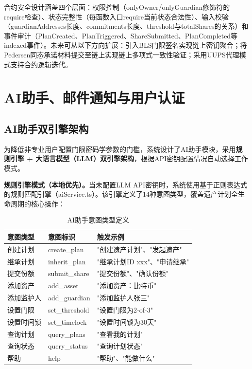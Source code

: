 \documentclass[UTF8,a4paper,zihao=-4,openany]{ctexrep}
\begin{document}
合约安全设计涵盖四个层面：权限控制（onlyOwner/onlyGuardian修饰符的require检查）、状态完整性（每函数入口require当前状态合法性）、输入校验（guardianAddresses长度、commitments长度、threshold与totalShares的关系）和事件审计（PlanCreated、PlanTriggered、ShareSubmitted、PlanCompleted等indexed事件）。未来可从以下方向扩展：引入BLS门限签名实现链上密钥聚合；将Pedersen同态承诺材料提交至链上实现链上多项式一致性验证；采用UUPS代理模式支持合约逻辑迭代。


\section{AI助手、邮件通知与用户认证}

\subsection{AI助手双引擎架构}

为降低非专业用户配置门限密码学参数的门槛，系统设计了AI助手模块，采用\textbf{规则引擎 + 大语言模型（LLM）双引擎架构}，根据API密钥配置情况自动选择工作模式。

\noindent\textbf{规则引擎模式（本地优先）。}当未配置LLM API密钥时，系统使用基于正则表达式的规则匹配引擎（aiService.ts）。该引擎定义了14种意图类型，覆盖遗产计划全生命周期的核心操作：

\begin{table}[H]
\centering
\caption{AI助手意图类型定义}
\label{tab:ai_intents}
\begin{tabularx}{\textwidth}{p{2.8cm}p{2.8cm}X}
\toprule
意图类型 & 意图标识 & 触发示例\\
\midrule
创建计划 & create\_plan & "创建遗产计划"、"发起遗产"\\
继承计划 & inherit\_plan & "继承计划ID xxx"、"申请继承"\\
提交份额 & submit\_share & "提交份额"、"确认份额"\\
添加资产 & add\_asset & "添加资产：比特币"\\
添加监护人 & add\_guardian & "添加监护人张三"\\
设置门限 & set\_threshold & "设置门限为2-of-3"\\
设置时间锁 & set\_timelock & "设置时间锁为30天"\\
查询计划 & query\_plans & "查看我的计划"\\
查询状态 & query\_status & "查询计划状态"\\
帮助 & help & "帮助"、"能做什么"\\
\bottomrule
\end{tabularx}
\end{table}
\end{document}
